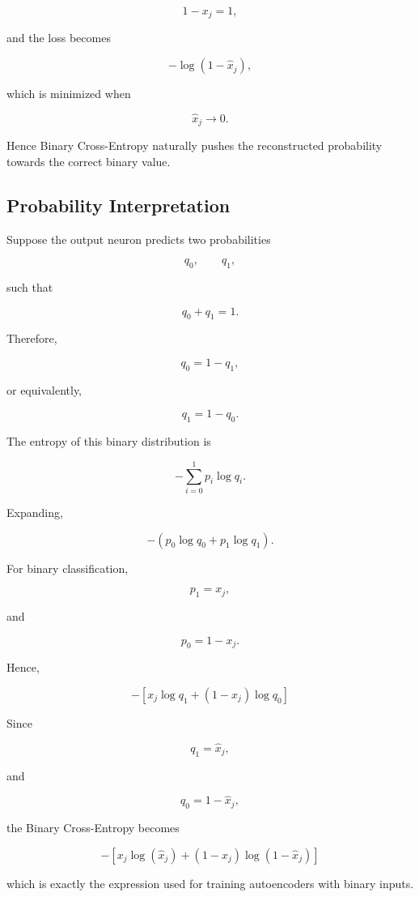 \documentclass{article}
\begin{document}
	\[
	1-x_j=1,
	\]
	
	and the loss becomes
	
	\[
	-\log(1-\hat{x}_j),
	\]
	
	which is minimized when
	
	\[
	\boxed{\hat{x}_j\rightarrow0.}
	\]
	
	Hence Binary Cross-Entropy naturally pushes the reconstructed probability
	towards the correct binary value.
	
	\subsection*{Probability Interpretation}
	
	Suppose the output neuron predicts two probabilities
	
	\[
	q_0,\qquad q_1,
	\]
	
	such that
	
	\[
	q_0+q_1=1.
	\]
	
	Therefore,
	
	\[
	q_0=1-q_1,
	\]
	
	or equivalently,
	
	\[
	q_1=1-q_0.
	\]
	
	The entropy of this binary distribution is
	
	\[
	-
	\sum_{i=0}^{1}
	p_i\log q_i.
	\]
	
	Expanding,
	
	\[
	-
	(p_0\log q_0+p_1\log q_1).
	\]
	
	For binary classification,
	
	\[
	p_1=x_j,
	\]
	
	and
	
	\[
	p_0=1-x_j.
	\]
	
	Hence,
	
	\[
	\boxed{
		-
		\left[
		x_j\log q_1
		+
		(1-x_j)\log q_0
		\right]
	}
	\]
	
	Since
	
	\[
	q_1=\hat{x}_j,
	\]
	
	and
	
	\[
	q_0=1-\hat{x}_j,
	\]
	
	the Binary Cross-Entropy becomes
	
	\[
	\boxed{
		-
		\left[
		x_j\log(\hat{x}_j)
		+
		(1-x_j)\log(1-\hat{x}_j)
		\right]
	}
	\]
	
	which is exactly the expression used for training autoencoders with binary
	inputs.
	
\end{document}
